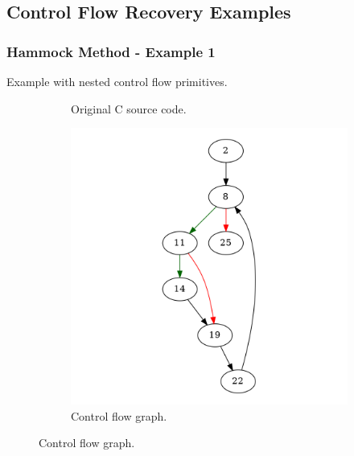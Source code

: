 
\subsection{Control Flow Recovery Examples}
\label{app:control_flow_recovery_examples}



\subsubsection{Hammock Method - Example 1}
\label{app:hammock_example1}

Example with nested control flow primitives.

\begin{figure}[htbp]
	\centering
	\begin{subfigure}[b]{0.48\textwidth}
		\centering
		
		\caption{Original C source code.}
	\end{subfigure}
	\begin{subfigure}[b]{0.50\textwidth}
		\centering
		\includegraphics[width=\textwidth]{inc/appendices/examples/hammock/example/without-break/main.png}
		\caption{Control flow graph.}
	\end{subfigure}
\end{figure}

